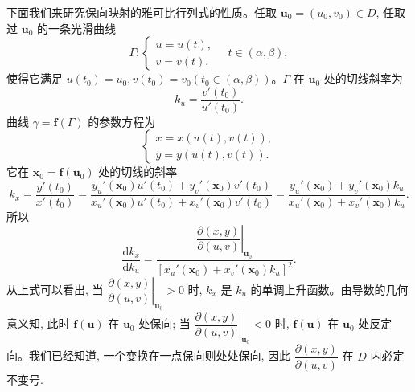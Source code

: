 \begin{solve}
下面我们来研究保向映射的雅可比行列式的性质。任取 $\boldsymbol u_0=(u_0,v_0)\in D$, 任取过 $\boldsymbol u_0$ 的一条光滑曲线
\[
  \Gamma:\begin{cases}
    u=u(t),\\
    v=v(t),
  \end{cases}\quad t\in(\alpha,\beta),
\]
使得它满足 $u(t_0)=u_0,v(t_0)=v_0(t_0\in(\alpha,\beta))$。$\Gamma$ 在 $\boldsymbol u_0$ 处的切线斜率为
\[
  k_u=\frac{v'(t_0)}{u'(t_0)}.
\]
曲线 $\gamma=\boldsymbol f(\Gamma)$ 的参数方程为
\[
  \begin{cases}
    x=x(u(t),v(t)),\\
    y=y(u(t),v(t)).
  \end{cases}
\]
它在 $\boldsymbol x_0=\boldsymbol f(\boldsymbol u_0)$ 处的切线的斜率
\[
  k_x=\frac{y'(t_0)}{x'(t_0)}
  =\frac{y_u'(\boldsymbol x_0)u'(t_0)+y_v'(\boldsymbol x_0)v'(t_0)}
  {x_u'(\boldsymbol x_0)u'(t_0)+x_v'(\boldsymbol x_0)v'(t_0)}
  =\frac{y_u'(\boldsymbol x_0)+y_v'(\boldsymbol x_0)k_u}
  {x_u'(\boldsymbol x_0)+x_v'(\boldsymbol x_0)k_u}.
\]
所以
\[
  \frac{\mathrm dk_x}{\mathrm dk_u}
  =
  \frac{\left.\dfrac{\partial(x,y)}{\partial(u,v)}\right|_{\boldsymbol u_0}}
  {[x_u'(\boldsymbol x_0)+x_v'(\boldsymbol x_0)k_u]^2}.
\]
从上式可以看出, 当 $\left.\dfrac{\partial(x,y)}{\partial(u,v)}\right|_{\boldsymbol u_0}>0$ 时, $k_x$ 是 $k_u$ 的单调上升函数。由导数的几何意义知, 此时 $\boldsymbol f(\boldsymbol u)$ 在 $\boldsymbol u_0$ 处保向; 当 $\left.\dfrac{\partial(x,y)}{\partial(u,v)}\right|_{\boldsymbol u_0}<0$ 时, $\boldsymbol f(\boldsymbol u)$ 在 $\boldsymbol u_0$ 处反定向。我们已经知道, 一个变换在一点保向则处处保向, 因此 $\dfrac{\partial(x,y)}{\partial(u,v)}$ 在 $D$ 内必定不变号.


\end{solve}
